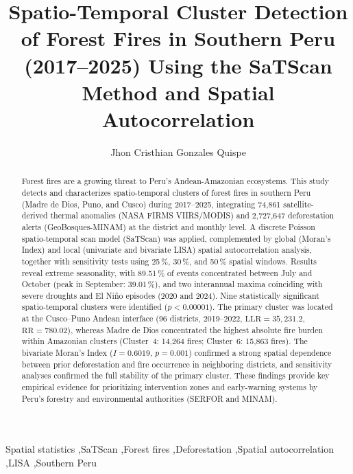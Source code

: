 \documentclass[preprint,12pt,authoryear]{elsarticle}
\begin{document}
	
	\begin{frontmatter}
		
		\title{Spatio-Temporal Cluster Detection of Forest Fires in Southern Peru (2017--2025) Using the SaTScan Method and Spatial Autocorrelation}
		
		\author[1]{Jhon Cristhian Gonzales Quispe}
		\address[1]{Universidad Nacional del Altiplano, Puno, Peru}
		
		\begin{abstract}
			Forest fires are a growing threat to Peru's Andean-Amazonian
			ecosystems. This study detects and characterizes spatio-temporal
			clusters of forest fires in southern Peru (Madre de Dios, Puno, and
			Cusco) during 2017--2025, integrating 74{,}861 satellite-derived
			thermal anomalies (NASA FIRMS VIIRS/MODIS) and 2{,}727{,}647
			deforestation alerts (GeoBosques-MINAM) at the district and monthly
			level. A discrete Poisson spatio-temporal scan model (SaTScan) was
			applied, complemented by global (Moran's Index) and local
			(univariate and bivariate LISA) spatial autocorrelation analysis,
			together with sensitivity tests using 25\,\%, 30\,\%, and 50\,\%
			spatial windows. Results reveal extreme seasonality, with 89.51\,\%
			of events concentrated between July and October (peak in September:
			39.01\,\%), and two interannual maxima coinciding with severe
			droughts and El Ni\~no episodes (2020 and 2024). Nine statistically
			significant spatio-temporal clusters were identified
			($p < 0.00001$). The primary cluster was located at the
			Cusco--Puno Andean interface (96 districts, 2019--2022,
			$\text{LLR} = 35{,}231.2$, $\text{RR} = 780.02$), whereas Madre de
			Dios concentrated the highest absolute fire burden within Amazonian
			clusters (Cluster~4: 14{,}264 fires; Cluster~6: 15{,}863 fires). The
			bivariate Moran's Index ($I = 0.6019$, $p = 0.001$) confirmed a
			strong spatial dependence between prior deforestation and fire
			occurrence in neighboring districts, and sensitivity analyses
			confirmed the full stability of the primary cluster. These findings
			provide key empirical evidence for prioritizing intervention zones
			and early-warning systems by Peru's forestry and environmental
			authorities (SERFOR and MINAM).
		\end{abstract}
		
		\begin{keyword}
			Spatial statistics \sep SaTScan \sep Forest fires \sep Deforestation \sep Spatial autocorrelation \sep LISA \sep Southern Peru
		\end{keyword}
		
	\end{frontmatter}
	
\end{document}
